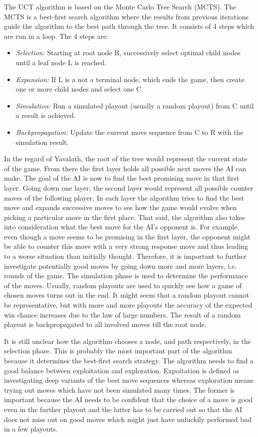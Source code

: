 \documentclass[german]{report}
\begin{document}
The UCT algorithm is based on the Monte Carlo Tree Search (MCTS). The MCTS is a
best-first search algorithm where the results from previous iterations guide the
algorithm to the best path through the tree. It consists of 4 steps which are
run in a loop. The 4 steps are: %
\begin{itemize}
	\item \textit{Selection:} Starting at root node R, successively select optimal child nodes until a leaf node L is reached.
	\item \textit{Expansion:}  If L is a not a terminal node, which ends the game, then create one or more child nodes and select one C.
	\item \textit{Simulation:}  Run a simulated playout (usually a random playout) from C until a result is achieved.
	\item \textit{Backpropagation:}  Update the current move sequence from C to R with the simulation result.
\end{itemize}

In the regard of Yavalath, the root of the tree would represent the current
state of the game. From there the first layer holds all possible next moves the
AI can make. The goal of the AI is now to find the best promising move in that
first layer. Going down one layer, the second layer would represent all possible
counter moves of the following player. In each layer the algorithm tries to find
the best move and expands successive moves to see how the game would evolve when
picking a particular move in the first place. That said, the algorithm also
takes into consideration what the best move for the AI's opponent is. For example,
even though a move seems to be promising in the first layer, the opponent might
be able to counter this move with a very strong response move and thus leading
to a worse situation than initially thought. Therefore, it is important to
further investigate potentially good moves by going down more and more layers,
i.e. rounds of the game. The simulation phase is used to determine the
performance of the moves. Usually, random playouts are used to quickly see how a
game of chosen moves turns out in the end. It might seem that a random playout
cannot be representative, but with more and more playouts the accuracy of the
expected win chance increases due to the law of large numbers. %
The result of a random playout is backpropagated to all involved moves till the
root node.

It is still unclear how the algorithm chooses a node, and path
respectively, in the selection phase. This is probably the most important part
of the algorithm because it determines the best-first search strategy. The
algorithm needs to find a good balance between exploitation and exploration.
Expoitation is defined as investigating deep variants of the best move sequences
whereas exploration means trying out moves which have not been simulated many
times. The former is important because the AI needs to be confident that the
choice of a move is good even in the further playout and the latter has to be
carried out so that the AI does not miss out on good moves which might just have
unluckily performed bad in a few playouts.
\end{document}
